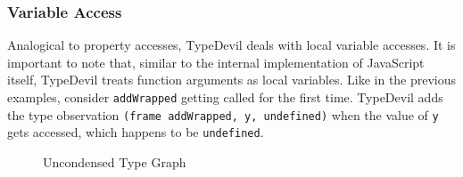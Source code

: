 \documentclass[runningheads,a4paper]{llncs}
\begin{document}
\subsubsection{Variable Access}
Analogical to property accesses, TypeDevil deals with local variable accesses.
It is important to note that, similar to the internal implementation of JavaScript itself, TypeDevil treats function arguments as local variables.
Like in the previous examples, consider \lstinline[columns=fixed]{addWrapped} getting called for the first time.
TypeDevil adds the type observation \lstinline[columns=fixed]{(frame addWrapped, y, undefined)} when the value of \lstinline[columns=fixed]{y} gets accessed, which happens to be \lstinline[columns=fixed]{undefined}.
\begin{figure}[h]
    \caption{Uncondensed Type Graph}
    \label{fig:UncondensedTG}
    \end{figure}
\end{document}
